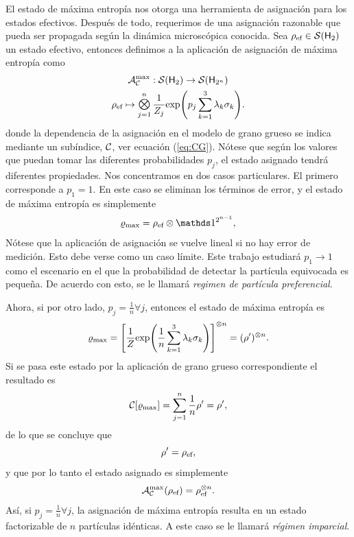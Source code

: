 El estado de máxima entropía nos otorga una herramienta de asignación para los estados efectivos. Después de todo, requerimos de una asignación razonable que pueda ser propagada según la dinámica microscópica conocida. Sea $\rho_{\text{ef}}\in\mathcal{S}({\sf H}_{2})$ un estado efectivo, entonces definimos a la aplicación de asignación de máxima entropía como
\begin{equation}\label{eq:MaxEntAss}
    \begin{gathered}
        \mcA_{\mcC}^{\max}:\densityspace{2}\rightarrow\densityspace{2^{n}}\nonumber\\
        \rho_{\ef} \mapsto \Motimes_{j=1}^{n}\frac{1}{Z_{j}}\text{exp}\qty(p_{j}\sum_{k=1}^{3}\lambda_{k}\sigma_{k}).
    \end{gathered}
\end{equation}
donde la dependencia de la asignación en el modelo de grano grueso se indica mediante un subíndice, $\mathcal{C}$, ver ecuación (\ref{eq:CG}). Nótese que según los valores que puedan tomar las diferentes probabilidades $p_{j}$, el estado asignado tendrá diferentes propiedades. Nos concentramos en dos casos particulares. El primero corresponde a $p_{1}=1$. En este caso se eliminan los términos de error, y el estado de máxima entropía es simplemente
\begin{equation}\label{eq:PreferentialAss}
    \varrho_{\max}=\rho_{\ef}\otimes\Id^{2^{n-1}},
\end{equation}
Nótese que la aplicación de asignación se vuelve lineal si no hay error de medición. Esto debe verse como un caso límite. Este trabajo estudiará $p_{1}\rightarrow 1$ como el escenario en el que la probabilidad de detectar la partícula equivocada es pequeña. De acuerdo con esto, se le llamará  \textit{regimen de partícula preferencial}.

Ahora, si por otro lado, $p_{j}=\frac{1}{n}\forall j$, entonces el estado de máxima entropía es
\begin{equation}
    \varrho_{\max}=\qty[\frac{1}{Z}\text{exp}\qty(\frac{1}{n}\sum_{k=1}^{3}\lambda_{k}\sigma_{k})]^{\otimes n}=(\rho')^{\otimes n}.\nonumber
\end{equation}
Si se pasa este estado por la aplicación de grano grueso correspondiente el resultado es 
\begin{equation}
    \mathcal{C}[\varrho_{\max}]=\sum_{j=1}^{n}\frac{1}{n}\rho'=\rho',\nonumber
\end{equation}
de  lo que se concluye que
\begin{equation*}
    \rho'=\rho_{\text{ef}},
\end{equation*}
y que por lo tanto el estado asignado es simplemente
\begin{equation}\label{eq:BoltzmannAss}
    \mathcal{A}_{\mathcal{C}}^{\max}(\rho_{\text{ef}})=\rho_{\text{ef}}^{\otimes n}.
\end{equation}
Así, si $p_{j}=\frac{1}{n}\forall j$, la asignación de máxima entropía resulta en un estado factorizable de $n$ partículas idénticas. A este caso se le llamará \textit{régimen imparcial}.



